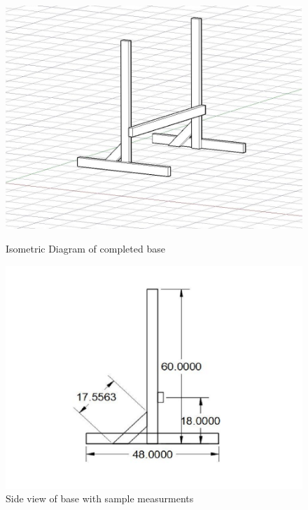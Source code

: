 \documentclass[titlepage]{article}
\begin{document}
            \begin{figure}[!htb]
                  \includegraphics[width=\linewidth]{base_3d}
                  \caption{Isometric Diagram of completed base}\label{fig:awesome_image1}
                \endminipage\hfill
                  \includegraphics[width=\linewidth]{base_side}
                  \caption{Side view of base with sample measurments}\label{fig:awesome_image2}
                \endminipage\hfill

\end{figure}
\end{document}
